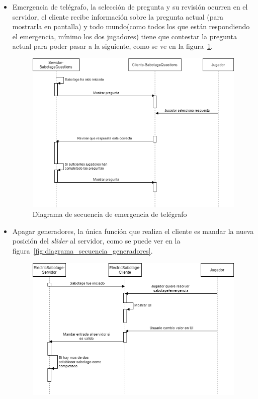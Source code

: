 \begin{itemize}
    \item Emergencia de telégrafo, la selección de pregunta y su revisión ocurren en el servidor, el cliente recibe información sobre la pregunta actual (para mostrarla en pantalla) y  todo mundo(como todos los que están respondiendo el emergencia, mínimo los dos jugadores) tiene que contestar la pregunta actual para poder pasar a la siguiente, como se ve en la figura~\ref{fig:diagrama_secuencia_emergencia_pregunta}.
        \begin{figure}[h]
            \centering
            \includegraphics[width=1\linewidth]{images/diagrama_secuencia_sabotage_preguntas.png}
            \caption{Diagrama de secuencia de emergencia de telégrafo}
            \label{fig:diagrama_secuencia_emergencia_pregunta}
        \end{figure}
    \item Apagar generadores, la única función que realiza el cliente es mandar la nueva posición del \textit{slider} al servidor, como se puede ver en la figura~\ref{fig:diagrama_secuencia_generadores}.
        \begin{figure}[h]
            \centering
            \includegraphics[width=1\linewidth]{images/DiagramaSecuenciaSabotageGeneradores.png}

\end{figure}
\end{itemize}
